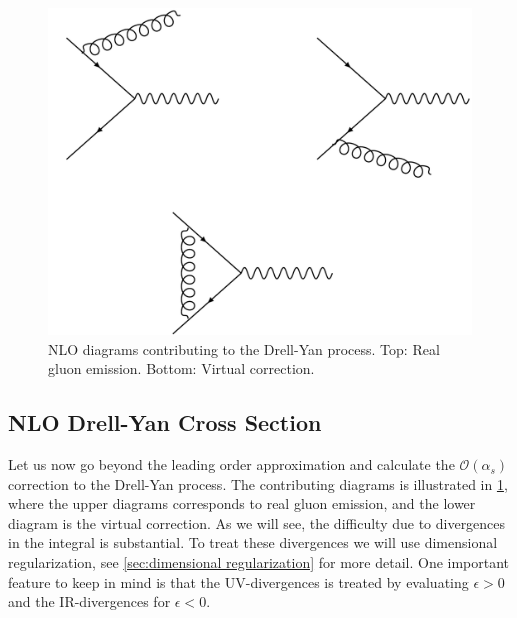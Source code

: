 \begin{figure}
    \centering
    \includegraphics[scale=0.3]{Figures/radiativecorrDY.pdf}
    \caption{NLO diagrams contributing to the Drell-Yan process. Top: Real gluon emission. Bottom: Virtual correction.}
    \label{fig:NLO drell-yan}
\end{figure}
\subsection{NLO Drell-Yan Cross Section}\label{sec:NLO drell yan calculation}
Let us now go beyond the leading order approximation and calculate the $\mathcal{O}(\alpha_s)$ correction to the Drell-Yan process. The contributing diagrams is illustrated in \cref{fig:NLO drell-yan}, where the upper diagrams corresponds to real gluon emission, and the lower diagram is the virtual correction. As we will see, the difficulty due to divergences in the integral is substantial. To treat these divergences we will use dimensional regularization, see \cref{sec:dimensional regularization} for more detail. One important feature to keep in mind is that the UV-divergences is treated by evaluating $\epsilon>0$ and the IR-divergences for $\epsilon<0$. 

